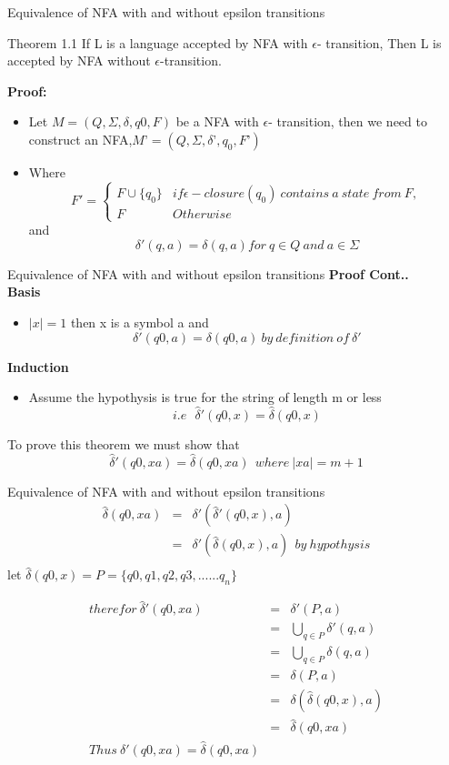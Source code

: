 \documentclass{beamer}
\begin{document}
\begin{frame}{Equivalence of NFA with and without epsilon transitions}
\begin{block}{Theorem 1.1}
If L is a language accepted by NFA with $\epsilon$- transition, Then L is accepted by NFA without
$\epsilon$-transition.
\end{block}
\textbf{Proof:}
\begin{itemize}
	\item Let $M = (Q,\Sigma,\delta,q0,F)$ be a NFA with $\epsilon$- transition, then we need to construct an NFA,$M’ = (Q,\Sigma,\delta’,q_0,F’)$
	\item Where
	$$
	F'=\begin{cases}
		F \cup \{q_0\} & if \epsilon-closure(q_0)\  contains\  a \ state\  from\  F,  \\
		F & Otherwise
	\end{cases}
	$$
 and
	$$\delta'(q,a)=\delta(q,a) for\  q\in Q\  and\ a \in \Sigma  $$
\end{itemize}
\end{frame}
\begin{frame}{Equivalence of NFA with and without epsilon transitions}
	\textbf{Proof Cont..}\\
	\textbf{Basis}
	\begin{itemize}
		\item $|x|=1$ then x is a symbol a and
		$$\delta'(q0,a)=\delta(q0,a)\ by \ definition \ of\ \delta'$$
	\end{itemize}
	\textbf{Induction}
\begin{itemize}
\item Assume the hypothysis is true for the string of length m or less
$$i.e\  \ \ \hat{\delta}'(q0,x)=\hat{\delta}(q0,x)$$
\end{itemize}
To prove this theorem we must show that 
$$\hat{\delta}'(q0,xa)=\hat{\delta}(q0,xa)\  \ where\  |xa|=m+1$$
\end{frame}
\begin{frame}{Equivalence of NFA with and without epsilon transitions}
	\small
	\begin{eqnarray*}
\hat{\delta}(q0,xa) &=& \delta'(\hat{\delta}'(q0,x),a)\\
					&=& \delta'(\hat{\delta}(q0,x),a) \ \ by\ hypothysis\\				
	\end{eqnarray*}
let $\hat{\delta}(q0,x)=P=\{q0,q1,q2,q3,......q_n\}$

\begin{eqnarray*}
	therefor\ \hat{\delta}'(q0,xa)&=&\delta'(P,a)\\
							&=&\bigcup\limits_{q \in P}	\delta'(q,a)\\
							&=&\bigcup\limits_{q \in P}	\delta(q,a)\\
							&=&	\delta(P,a)\\
							&=&	\delta(\hat{\delta}(q0,x),a)\\
							&=&	\hat{\delta}
							(q0,xa)\\	
						Thus\  \delta'(q0,xa)=\hat{\delta}(q0,xa)
\end{eqnarray*}
\end{frame}
\end{document}

